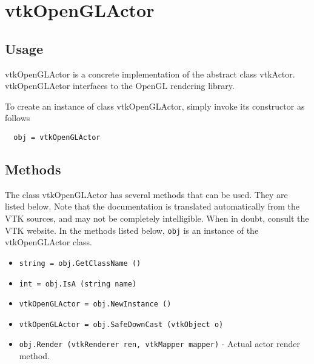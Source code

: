 \section{vtkOpenGLActor}

\subsection{Usage}

 vtkOpenGLActor is a concrete implementation of the abstract class vtkActor.
 vtkOpenGLActor interfaces to the OpenGL rendering library.

To create an instance of class vtkOpenGLActor, simply
invoke its constructor as follows
\begin{verbatim}
  obj = vtkOpenGLActor
\end{verbatim}
\subsection{Methods}

The class vtkOpenGLActor has several methods that can be used.
  They are listed below.
Note that the documentation is translated automatically from the VTK sources,
and may not be completely intelligible.  When in doubt, consult the VTK website.
In the methods listed below, \verb|obj| is an instance of the vtkOpenGLActor class.
\begin{itemize}
\item  \verb|string = obj.GetClassName ()|

\item  \verb|int = obj.IsA (string name)|

\item  \verb|vtkOpenGLActor = obj.NewInstance ()|

\item  \verb|vtkOpenGLActor = obj.SafeDownCast (vtkObject o)|

\item  \verb|obj.Render (vtkRenderer ren, vtkMapper mapper)| -  Actual actor render method.

\end{itemize}
